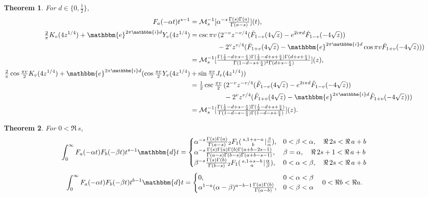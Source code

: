 \documentclass[12pt]{article}
\newcommand{\ee}[0] {\mathbbm{e}}
\newcommand{\ii}[0] {\mathbbm{i}}
\newcommand{\dd}[0] {\mathbbm{d}}
\numberwithin{equation}{section}
\newtheorem{theorem}{Theorem}[section]
\newcommand{\Head}[3] {{}_{#1}{#2}_{#3}}
\newcommand{\ArgS}[3] {( \begin{smallmatrix} #1 \\ #2 \end{smallmatrix} | {#3})}
\newcommand{\HypJ}[2] {F_{#1}(#2)}
\newcommand{\HypJreg}[2] {{\tilde{F}}_{#1}(#2)}
\begin{document}
\begin{theorem}
For $d \in \{0, \frac12\}$,
\begin{align*}
\HypJ{a}{- \alpha t} t^{s-1} &= \mathcal{M}_s^{-1}[\alpha^{-s} \tfrac{\Gamma(s) \Gamma(a)}{\Gamma(a-s)}](t)\text{,}\\
\tfrac{2}{\pi} K_v(4 z^{1/4}) + \ee^{2 \pi \ii  d} Y_v(4z^{1/4}) &=
\csc \pi  v \, (2^{-v} z^{-v/4} (\HypJreg{1-v}{4\sqrt{z}}-e^{2 i \pi  d} \HypJreg{1-v}{-4   \sqrt{z}})\\
& \quad \quad \quad \quad - 2^v z^{v/4} (\HypJreg{1+v}{4 \sqrt{z}} - \ee^{2 \pi \ii  d} \cos \pi  v  \HypJreg {1+v}{-4\sqrt{z}}))\\
&= \mathcal{M}_s^{-1}[\tfrac{\Gamma(\frac{1}{2}-d+s-\frac{v}{4}) \Gamma(\frac12-d+s+\frac{v}{4}) \Gamma(d+s+\frac{v}{4})}{\Gamma(1-d-s+\frac{v}{4})^2 \Gamma(d+s-\frac{v}{4})}](z)\text{,}\\
\tfrac{2}{\pi}  \cos \tfrac{\pi  v}{2} K_v(4 z^{1/4}) + \ee^{2 \pi \ii  d} (\cos \tfrac{\pi  v}{2} Y_v(4z^{1/4}) &+ \sin \tfrac{\pi  v}{2} J_v(4z^{1/4}))\\
&=
\tfrac12 \csc \tfrac{\pi  v}{2} \, (2^{-v} z^{-v/4} (\HypJreg{1-v}{4\sqrt{z}}-e^{2 i \pi  d} \HypJreg{1-v}{-4   \sqrt{z}})\\
&\quad \quad \quad \quad \quad - 2^v z^{v/4} (\HypJreg{1+v}{4 \sqrt{z}} - \ee^{2 \pi \ii  d}  \HypJreg {1+v}{-4\sqrt{z}}))\\
&= \mathcal{M}_s^{-1}[\tfrac{\Gamma(\frac{1}{2}-d+s-\frac{v}{4}) \Gamma(\frac12-d+s+\frac{v}{4})}{\Gamma(1-d-s-\frac{v}{4}) \Gamma(1-d-s+\frac{v}{4})}](z)\text{.}
\end{align*}
\end{theorem}

\begin{theorem}
For $0 < \Re \, s$,
\begin{equation*}
\int_{0}^{\infty} \HypJ{a}{-\alpha t} \HypJ{b}{-\beta t} t^{s-1} \dd t = 
\begin{cases}
\alpha^{-s}\tfrac{\Gamma(s) \Gamma(a)}{\Gamma(a-s)}  \Head{2}{F}{1} \ArgS{s,1+s-a}{b}{\tfrac{\beta}{\alpha}}\text{,} & 0 < \beta < \alpha, \quad \Re\, 2s < \Re \, a + b\\
\alpha^{-s} \tfrac{\Gamma(s) \Gamma(a)\Gamma(b)\Gamma(a+b-2s-1)}{\Gamma(a-s)\Gamma(b-s)\Gamma(a+b-s-1)}\text{,} & \beta = \alpha, \quad \Re \, 2s+1 < \Re \, a + b\\
\beta^{-s}\tfrac{\Gamma(s) \Gamma(b)}{\Gamma(b-s)}  \Head{2}{F}{1} \ArgS{s,1+s-b}{a}{\tfrac{\alpha}{\beta}}\text{,} & 0 < \alpha < \beta, \quad \Re\, 2s < \Re \, a + b
\end{cases}
\end{equation*}
\begin{equation*}
\int_{0}^{\infty} \HypJ{a}{-\alpha t} \HypJ{b}{-\beta t} t^{b-1} \dd t = \begin{cases}
 0 \text{,} &0 < \alpha < \beta\\
 \alpha^{1-a} (\alpha-\beta)^{a-b-1} \tfrac{\Gamma(a)\Gamma(b)}{\Gamma(a-b)}\text{,} &0 < \beta < \alpha
\end{cases} \quad 0 < \Re b < \Re a\text{.}
\end{equation*}
\end{theorem}
\end{document}
